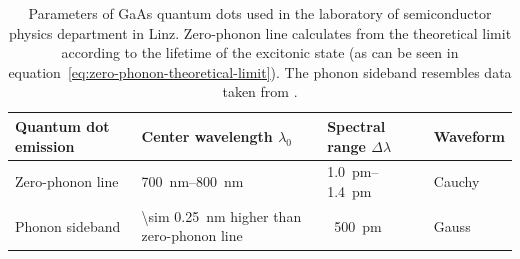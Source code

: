 \begin{table}[H]
	\caption[Paramters of GaAs quantum dots used in the laboratory of semiconductor physics department in Linz.]{Parameters of GaAs quantum dots used in the laboratory of semiconductor physics department in Linz.
		Zero-phonon line calculates from the theoretical limit according to the lifetime of the excitonic state (as can be seen in equation~\eqref{eq:zero-phonon-theoretical-limit}).
		The phonon sideband resembles data taken from \textcite{scholl_resonance_2019}.}
	\label{tab:quantum-dot-emission}
	\begin{tabular}{@{}llll@{}}
		\toprule
		Quantum dot emission & Center wavelength $\lambda_0$           & Spectral range $\Delta \lambda$ & Waveform                  \\ \midrule
		Zero-phonon line               & \SIrange{700}{800}{\nano \metre} & \SIrange{1.0}{1.4}{\pico \metre} & Cauchy\\
		Phonon sideband       & \SI{\sim 0.25}{\nano \metre} higher than zero-phonon line  & ~\SI{500}{\pico \metre} & Gauss  \\ \bottomrule
	\end{tabular}
\end{table}

\newpage

